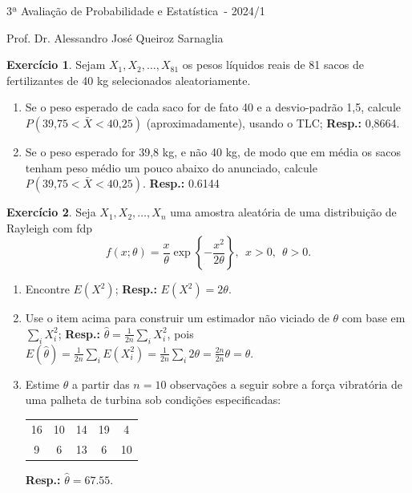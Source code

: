 \documentclass[]{article}
\newcommand{\avaliacao}{3}
\newcommand{\disciplina}{Probabilidade e Estatística}
\newcommand{\semestre}{2024/1}
\theoremstyle{definition}
\newtheorem{ex}{Exercício}
\begin{document}
\thispagestyle{empty}
\begin{center}
\Large{\avaliacao ª Avaliação de \disciplina\ - \semestre}

\large{Prof. Dr. Alessandro José Queiroz Sarnaglia}
\end{center}

\begin{ex}
Sejam $X_1, X_2, \ldots , X_{81}$ os pesos líquidos reais de 81 sacos de fertilizantes de 40 kg selecionados aleatoriamente.
\begin{enumerate}
	\item Se o peso esperado de cada saco for de fato 40 e a desvio-padrão 1,5, calcule $P(39\text{,}75 < \bar{X} < 40\text{,}25)$ (aproximadamente), usando o TLC; \textbf{Resp.:} 0,8664.
	\item Se o peso esperado for 39,8 kg, e não 40 kg, de modo que em média os sacos tenham peso médio um pouco abaixo do anunciado, calcule $P(39\text{,}75 < \bar{X} < 40\text{,}25)$. \textbf{Resp.:} 0.6144
\end{enumerate}
\end{ex}


\begin{ex}
Seja $X_1, X_2, \ldots, X_n$ uma amostra aleatória de uma distribuição de Rayleigh com fdp
$$
f(x;\theta) = \frac{x}{\theta}\exp\left\{-\frac{x^2}{2\theta}\right\}, \ \ x > 0, \ \ \theta>0.
$$
\begin{enumerate}
	\item Encontre $E(X^2)$; \textbf{Resp.:} $E(X^2) = 2\theta$.
	\item Use o item acima para construir um estimador não viciado de $\theta$ com base em $\sum_iX_i^2$; \textbf{Resp.:} $\hat\theta = \frac{1}{2n}\sum_i X_i^2$, pois $E(\hat\theta) = \frac{1}{2n}\sum_i E(X_i^2) = \frac{1}{2n}\sum_i 2\theta = \frac{2n}{2n} \theta = \theta$.
	\item Estime $\theta$ a partir das $n = 10$ observações a seguir sobre a força vibratória de uma palheta de turbina sob condições especificadas:
	\begin{center}
	\begin{tabular}{ccccc}
		16& 10& 14& 19&	4\\
		9 & 6 & 13& 6 &10\\
	\end{tabular}
	\end{center}
	\textbf{Resp.:} $\hat\theta = 67.55$.
\end{enumerate}
\end{ex}
\end{document}

